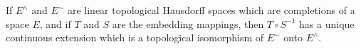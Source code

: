 If $E^\wedge$ and $E^\sim$ are linear topological Hausdorff spaces which are completions of a space $E$, and if $T$ and $S$ are the embedding mappings, then $T \circ S^{-1}$ has a unique continuous extension which is a topological isomorphism of $E^\sim$ onto $E^\wedge$.
